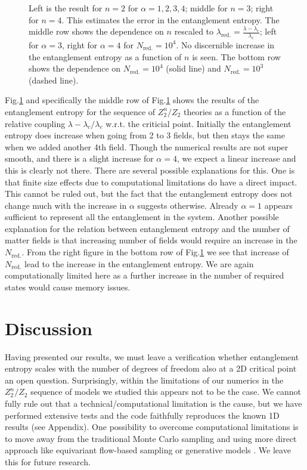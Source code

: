 \begin{figure}[t]
{			Left is the result for $n=2$ for $\alpha=1,2,3,4$; middle for $n=3$; right for $n=4$. This estimates the error in the entanglement entropy. The middle
			row shows the dependence on $n$ rescaled to $\lambda_{\text{red.}} =\frac{\lambda-\lambda_c}{\lambda_c}$; left for $\alpha=3$, right for $\alpha=4$ for $N_{\text{red.}}=10^4$. No discernible increase in the entanglement entropy as a function of $n$ is seen. The bottom row shows the dependence on $N_{\text{red.}}=10^4$ (solid line) and $N_{\text{red.}}=10^3$ (dashed line).}
		\label{fig:allEE}
	\end{figure}
	Fig.\ref{fig:allEE} and specifically the middle row of Fig.\ref{fig:allEE} shows the results of the entanglement entropy for the sequence of $Z_2^n/Z_2$ theories as a function of the relative coupling $\lambda-\lambda_c/\lambda_c$ w.r.t. the criticial point.
	Initially the entanglement entropy does increase when going from 2 to 3 fields, but then stays the same when we added another 4th field. Though the numerical results are not super smooth, and there is a slight increase for $\alpha=4$, we expect a linear increase and this is clearly not there. There are several possible explanations for this. One is that finite size effects due to computational limitations do have a direct impact. This cannot be ruled out, but the fact that the entanglement entropy does not change much with the increase in $\alpha$ suggests otherwise. Already $\alpha=1$ appears sufficient to represent all the entanglement in the system. Another possible explanation for the relation between entanglement entropy and the number of matter fields is that increasing number of fields would require an increase in the $N_{\text{red.}}$. From the right figure in the bottom row of Fig.\ref{fig:allEE} we see that increase of $N_{\text{red.}}$ lead to the increase in the entanglement entropy. We are again computationally limited here as a further increase in the number of required states would cause memory issues. 	
	
	\section{Discussion}
	\label{sec:conclusion}
	Having presented our results, we must leave a verification whether entanglement entropy scales with the number of degrees of freedom also at a 2D critical point an open question. Surprisingly, within the limitations of our numerics in the $Z_2^n/Z_2$ sequence of models we studied this appears not to be the case. We cannot fully rule out that a technical/computational limitation is the cause, but we have performed extensive tests and the code faithfully reproduces the known 1D results (see Appendix). One possibility to overcome computational limitations is to move away from the traditional Monte Carlo sampling and using more direct approach like equivariant flow-based sampling \cite{Kanwar_2020} or generative models \cite{medvidovic2021generative}. We leave this for future research.
	
